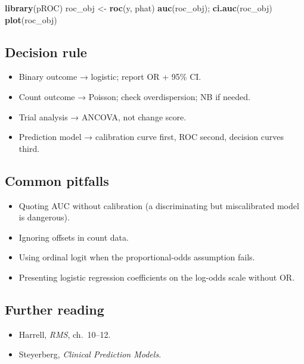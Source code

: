 \documentclass[
]{article}
\newenvironment{Shaded}{\begin{snugshade}}{\end{snugshade}}
\newcommand{\FunctionTok}[1]{\textcolor[rgb]{0.13,0.29,0.53}{\textbf{#1}}}
\newcommand{\NormalTok}[1]{#1}
\newcommand{\OtherTok}[1]{\textcolor[rgb]{0.56,0.35,0.01}{#1}}
\providecommand{\tightlist}{%
  \setlength{\itemsep}{0pt}\setlength{\parskip}{0pt}}
\begin{document}
\begin{Shaded}
\begin{Highlighting}[]
\FunctionTok{library}\NormalTok{(pROC)}
\NormalTok{roc\_obj }\OtherTok{\textless{}{-}} \FunctionTok{roc}\NormalTok{(y, phat)}
\FunctionTok{auc}\NormalTok{(roc\_obj); }\FunctionTok{ci.auc}\NormalTok{(roc\_obj)}
\FunctionTok{plot}\NormalTok{(roc\_obj)}
\end{Highlighting}
\end{Shaded}

\subsection{Decision rule}\label{decision-rule-6}

\begin{itemize}
\tightlist
\item
  Binary outcome → logistic; report OR + 95\% CI.
\item
  Count outcome → Poisson; check overdispersion; NB if needed.
\item
  Trial analysis → ANCOVA, not change score.
\item
  Prediction model → calibration curve first, ROC second, decision
  curves third.
\end{itemize}

\subsection{Common pitfalls}\label{common-pitfalls-6}

\begin{itemize}
\tightlist
\item
  Quoting AUC without calibration (a discriminating but miscalibrated
  model is dangerous).
\item
  Ignoring offsets in count data.
\item
  Using ordinal logit when the proportional-odds assumption fails.
\item
  Presenting logistic regression coefficients on the log-odds scale
  without OR.
\end{itemize}

\subsection{Further reading}\label{further-reading-6}

\begin{itemize}
\tightlist
\item
  Harrell, \emph{RMS}, ch.~10--12.
\item
  Steyerberg, \emph{Clinical Prediction Models}.
\end{itemize}
\end{document}
